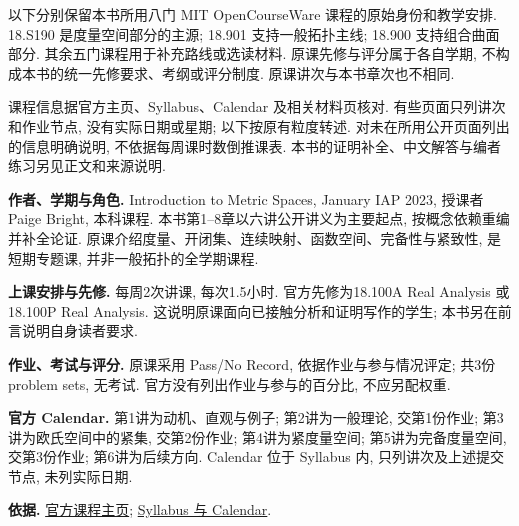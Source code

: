 \par\addvspace{14pt}
\par\nobreak\vspace{6pt}

以下分别保留本书所用八门 MIT OpenCourseWare 课程的原始身份和教学安排. 18.S190 是度量空间部分的主源; 18.901 支持一般拓扑主线; 18.900 支持组合曲面部分. 其余五门课程用于补充路线或选读材料. 原课先修与评分属于各自学期, 不构成本书的统一先修要求、考纲或评分制度. 原课讲次与本书章次也不相同.

课程信息据官方主页、Syllabus、Calendar 及相关材料页核对. 有些页面只列讲次和作业节点, 没有实际日期或星期; 以下按原有粒度转述. 对未在所用公开页面列出的信息明确说明, 不依据每周课时数倒推课表. 本书的证明补全、中文解答与编者练习另见正文和来源说明.

\par\addvspace{9pt}
\par\nobreak\vspace{4pt}

\textbf{作者、学期与角色.} Introduction to Metric Spaces, January IAP 2023, 授课者 Paige Bright, 本科课程. 本书第1--8章以六讲公开讲义为主要起点, 按概念依赖重编并补全论证. 原课介绍度量、开闭集、连续映射、函数空间、完备性与紧致性, 是短期专题课, 并非一般拓扑的全学期课程.

\textbf{上课安排与先修.} 每周2次讲课, 每次1.5小时. 官方先修为18.100A Real Analysis 或18.100P Real Analysis. 这说明原课面向已接触分析和证明写作的学生; 本书另在前言说明自身读者要求.

\textbf{作业、考试与评分.} 原课采用 Pass/No Record, 依据作业与参与情况评定; 共3份 problem sets, 无考试. 官方没有列出作业与参与的百分比, 不应另配权重.

\textbf{官方 Calendar.} 第1讲为动机、直观与例子; 第2讲为一般理论, 交第1份作业; 第3讲为欧氏空间中的紧集, 交第2份作业; 第4讲为紧度量空间; 第5讲为完备度量空间, 交第3份作业; 第6讲为后续方向. Calendar 位于 Syllabus 内, 只列讲次及上述提交节点, 未列实际日期.

\textbf{依据.} \href{https://ocw.mit.edu/courses/18-s190-introduction-to-metric-spaces-january-iap-2023/}{官方课程主页}; \href{https://ocw.mit.edu/courses/18-s190-introduction-to-metric-spaces-january-iap-2023/pages/syllabus/}{Syllabus 与 Calendar}.

